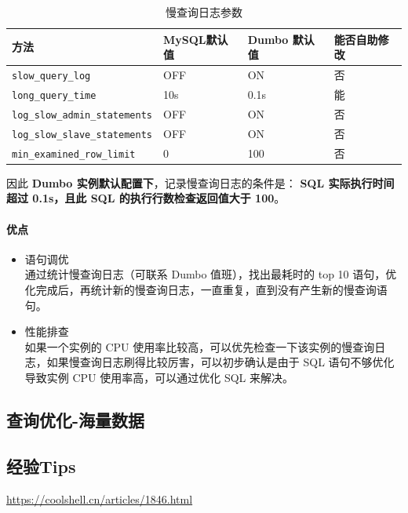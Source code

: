 \documentclass[UTF8,a4paper,12pt]{ctexbook}
\begin{document}
				\begin{table}[H]
					\centering
					\caption{慢查询日志参数}
					\begin{tabular}{p{6cm}<{\centering}|p{3cm}<{\centering}|p{3cm}<{\centering}|p{3cm}<{\centering}}
						\hline
							方法 &  MySQL默认值 &  Dumbo 默认值 & 能否自助修改\\
						\hline
						 \verb|slow_query_log| & OFF & ON &  否 \\
						 \verb|long_query_time| & 10s & 0.1s & 能 \\
						 \verb|log_slow_admin_statements| & OFF & ON & 否 \\
						 \verb|log_slow_slave_statements| & OFF & ON &否\\
						 \verb|min_examined_row_limit| & 0& 100 & 否 \\
						\hline
					\end{tabular}					
				\end{table}
				
				
				因此 \textbf{Dumbo 实例默认配置下}，记录慢查询日志的条件是：
				\textbf{SQL 实际执行时间超过 0.1s，且此 SQL 的执行行数检查返回值大于 100}。
			\paragraph{优点}
				\begin{itemize}
					\item 语句调优 \\ 通过统计慢查询日志（可联系 Dumbo 值班），找出最耗时的 top 10 语句，优化完成后，再统计新的慢查询日志，一直重复，直到没有产生新的慢查询语句。
					\item 性能排查 \\ 如果一个实例的 CPU 使用率比较高，可以优先检查一下该实例的慢查询日志，如果慢查询日志刷得比较厉害，可以初步确认是由于 SQL 语句不够优化导致实例 CPU 使用率高，可以通过优化 SQL 来解决。
				\end{itemize}

		\subsection{查询优化-海量数据}
		
		\subsection{经验Tips}
			\url{https://coolshell.cn/articles/1846.html}
			
\end{document}
